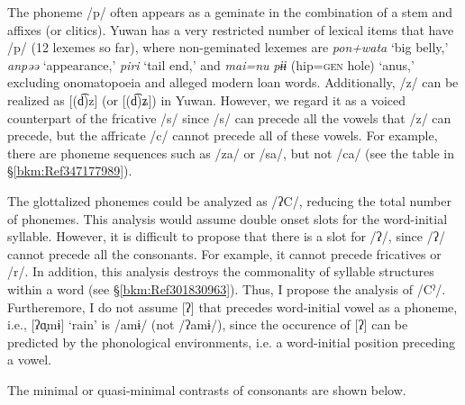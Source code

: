 The phoneme /p/ often appears as a geminate in the combination of a stem and affixes (or clitics). Yuwan has a very restricted number of lexical items that have /p/ (12 lexemes so far), where non-geminated lexemes are \textit{pon+wata} ‘big belly,’ \textit{anpəə} ‘appearance,’ \textit{piri} ‘tail end,’ and \textit{mai=nu} \textit{pɨɨ} (hip=\textsc{gen} hole) ‘anus,’ excluding onomatopoeia and alleged modern loan words. Additionally, /z/ can be realized as [(d͡)z] (or [(d͡)ʑ]) in Yuwan. However, we regard it as a voiced counterpart of the fricative /s/ since /s/ can precede all the vowels that /z/ can precede, but the affricate /c/ cannot precede all of these vowels. For example, there are phoneme sequences such as /za/ or /sa/, but not /ca/ (see the table in §\ref{bkm:Ref347177989}).

The glottalized phonemes could be analyzed as /ʔC/, reducing the total number of phonemes. This analysis would assume double onset slots for the word-initial syllable. However, it is difficult to propose that there is a slot for /ʔ/, since /ʔ/ cannot precede all the consonants. For example, it cannot precede fricatives or /r/. In addition, this analysis destroys the commonality of syllable structures within a word (see §\ref{bkm:Ref301830963}). Thus, I propose the analysis of /Cˀ/. Furtheremore, I do not assume [ʔ] that precedes word-initial vowel as a phoneme, i.e., [ʔɑ̟mɨ] ‘rain’ is /amɨ/ (not /ʔamɨ/), since the occurence of [ʔ] can be predicted by the phonological environments, i.e. a word-initial position preceding a vowel.

The minimal or quasi-minimal contrasts of consonants are shown below.

